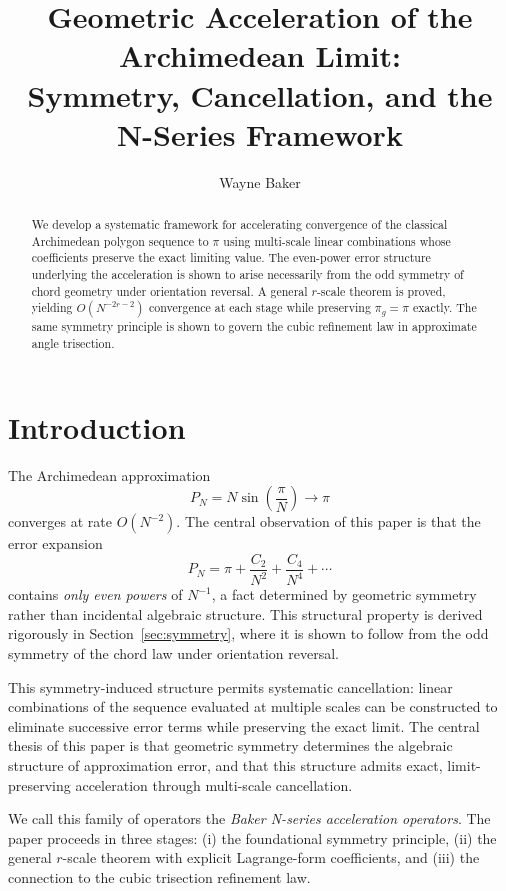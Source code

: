 \documentclass[12pt]{article}
\title{\textbf{Geometric Acceleration of the Archimedean Limit:\\
Symmetry, Cancellation, and the N-Series Framework}}
\author{Wayne Baker}
\date{}
\theoremstyle{remark}
\begin{document}
\maketitle

\begin{abstract}
We develop a systematic framework for accelerating convergence of the classical
Archimedean polygon sequence to $\pi$ using multi-scale linear combinations
whose coefficients preserve the exact limiting value. The even-power error
structure underlying the acceleration is shown to arise necessarily from
the odd symmetry of chord geometry under orientation reversal. A general
$r$-scale theorem is proved, yielding $O(N^{-2r-2})$ convergence at each
stage while preserving $\pi_g = \pi$ exactly. The same symmetry principle
is shown to govern the cubic refinement law in approximate angle trisection.
\end{abstract}

\section{Introduction}

The Archimedean approximation
\[
  P_N = N\sin\!\left(\frac{\pi}{N}\right) \longrightarrow \pi
\]
converges at rate $O(N^{-2})$. The central observation of this paper is that the error expansion
\[
  P_N = \pi + \frac{C_2}{N^2} + \frac{C_4}{N^4} + \cdots
\]
contains \emph{only even powers} of $N^{-1}$, a fact determined by geometric symmetry rather than incidental algebraic structure. This structural property is derived rigorously in Section~\ref{sec:symmetry}, where it is shown to follow from the odd symmetry of the chord law under orientation reversal.

This symmetry-induced structure permits systematic cancellation: linear combinations of the sequence evaluated at multiple scales can be constructed to eliminate successive error terms while preserving the exact limit. The central thesis of this paper is that geometric symmetry determines the algebraic structure of approximation error, and that this structure admits exact, limit-preserving acceleration through multi-scale cancellation.

We call this family of operators the \emph{Baker N-series acceleration operators}. The paper proceeds in three stages: (i) the foundational symmetry principle, (ii) the general $r$-scale theorem with explicit Lagrange-form coefficients, and (iii) the connection to the cubic trisection refinement law.
\end{document}

